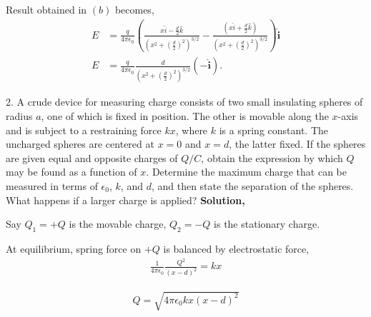 \documentclass{article}
\begin{document}
Result obtained in $(b)$ becomes,
\begin{align*}
E &= \frac{q}{4 \pi \epsilon_0} 
\left( 
\frac{x\hat{i} - \frac{d}{2} \hat{k}}{\left(x^2 + \left(\frac{d}{2}\right)^2\right)^{3/2}} 
- 
\frac{\left(x \hat{i} + \frac{d}{2}\hat{k}\right)}{\left(x^2 + \left(\frac{d}{2}\right)^2\right)^{3/2}}
\right) \mathbf{\hat{i}} 
\\
E &= \frac{q}{4 \pi \epsilon_0} 
\frac{d}{\left(x^2 + \left(\frac{d}{2}\right)^2\right)^{3/2}} (-\mathbf{\hat{i}}).
\end{align*}

2. A crude device for measuring charge consists of two small insulating spheres of radius $a$, one of which is fixed in position. The other is movable along the $x$-axis and is subject to a restraining force $kx$, where $k$ is a spring constant. The uncharged spheres are centered at $x = 0$ and $x = d$, the latter fixed. If the spheres are given equal and opposite charges of $Q/C$, obtain the expression by which $Q$ may be found as a function of $x$. Determine the maximum charge that can be measured in terms of $\epsilon_0$, $k$, and $d$, and then state the separation of the spheres. What happens if a larger charge is applied? \newline
\textbf{Solution,} \newline
\begin{figure}[!ht]
\centering
{}%

\label{fig,my_label}
\end{figure}
Say $Q_1 = +Q$ is the movable charge, $Q_2 = -Q$ is the stationary charge.

At equilibrium, spring force on $+Q$ is balanced by electrostatic force,
\begin{align*}
\frac{1}{4 \pi \epsilon_0} \frac{Q^2}{(x-d)^2} = kx
\end{align*}

\begin{align*}
Q = \sqrt{4 \pi \epsilon_0 k x (x-d)^2}
\end{align*}
\end{document}
